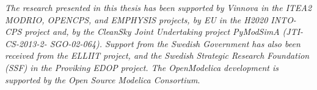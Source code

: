 \textit{The research presented in this thesis has been supported by Vinnova in the ITEA2 MODRIO, OPENCPS, and EMPHYSIS projects, by EU in the H2020 INTO-CPS project and, by the CleanSky Joint Undertaking project PyModSimA (JTI-CS-2013-2- SGO-02-064). Support from the Swedish Government has also been received from the ELLIIT project, and the Swedish Strategic Research Foundation (SSF) in the Proviking EDOP project. The OpenModelica development is supported by the Open Source Modelica Consortium}. 





